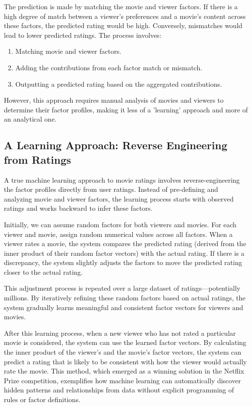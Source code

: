 \documentclass{article}
\begin{document}
The prediction is made by matching the movie and viewer factors. If there is a high degree of match between a viewer's preferences and a movie's content across these factors, the predicted rating would be high. Conversely, mismatches would lead to lower predicted ratings.  The process involves:
\begin{enumerate}
    \item Matching movie and viewer factors.
    \item Adding the contributions from each factor match or mismatch.
    \item Outputting a predicted rating based on the aggregated contributions.
\end{enumerate}
However, this approach requires manual analysis of movies and viewers to determine their factor profiles, making it less of a 'learning' approach and more of an analytical one.

\subsection{A Learning Approach: Reverse Engineering from Ratings}
A true machine learning approach to movie ratings involves reverse-engineering the factor profiles directly from user ratings. Instead of pre-defining and analyzing movie and viewer factors, the learning process starts with observed ratings and works backward to infer these factors.

Initially, we can assume random factors for both viewers and movies. For each viewer and movie, assign random numerical values across all factors.  When a viewer rates a movie, the system compares the predicted rating (derived from the inner product of their random factor vectors) with the actual rating.  If there is a discrepancy, the system slightly adjusts the factors to move the predicted rating closer to the actual rating.

This adjustment process is repeated over a large dataset of ratings—potentially millions. By iteratively refining these random factors based on actual ratings, the system gradually learns meaningful and consistent factor vectors for viewers and movies.

After this learning process, when a new viewer who has not rated a particular movie is considered, the system can use the learned factor vectors. By calculating the inner product of the viewer's and the movie's factor vectors, the system can predict a rating that is likely to be consistent with how the viewer would actually rate the movie. This method, which emerged as a winning solution in the Netflix Prize competition, exemplifies how machine learning can automatically discover hidden patterns and relationships from data without explicit programming of rules or factor definitions.
\end{document}
